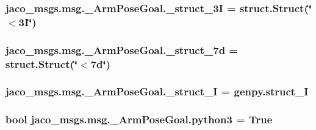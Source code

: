 \subsubsection[{\texorpdfstring{\+\_\+struct\+\_\+3I}{_struct_3I}}]{\setlength{\rightskip}{0pt plus 5cm}jaco\+\_\+msgs.\+msg.\+\_\+\+Arm\+Pose\+Goal.\+\_\+struct\+\_\+3I = struct.\+Struct(\char`\"{}$<$3\+I\char`\"{})\hspace{0.3cm}{\ttfamily [private]}}\hypertarget{namespacejaco__msgs_1_1msg_1_1__ArmPoseGoal_a1f4d3ad17579cc82a6b174aecb35eda6}{}\label{namespacejaco__msgs_1_1msg_1_1__ArmPoseGoal_a1f4d3ad17579cc82a6b174aecb35eda6}
\subsubsection[{\texorpdfstring{\+\_\+struct\+\_\+7d}{_struct_7d}}]{\setlength{\rightskip}{0pt plus 5cm}jaco\+\_\+msgs.\+msg.\+\_\+\+Arm\+Pose\+Goal.\+\_\+struct\+\_\+7d = struct.\+Struct(\char`\"{}$<$7d\char`\"{})\hspace{0.3cm}{\ttfamily [private]}}\hypertarget{namespacejaco__msgs_1_1msg_1_1__ArmPoseGoal_a61745e7c1be1c3f625392d61289a639c}{}\label{namespacejaco__msgs_1_1msg_1_1__ArmPoseGoal_a61745e7c1be1c3f625392d61289a639c}
\subsubsection[{\texorpdfstring{\+\_\+struct\+\_\+I}{_struct_I}}]{\setlength{\rightskip}{0pt plus 5cm}jaco\+\_\+msgs.\+msg.\+\_\+\+Arm\+Pose\+Goal.\+\_\+struct\+\_\+I = genpy.\+struct\+\_\+I\hspace{0.3cm}{\ttfamily [private]}}\hypertarget{namespacejaco__msgs_1_1msg_1_1__ArmPoseGoal_a226088dc549a186129ea22de76a2095b}{}\label{namespacejaco__msgs_1_1msg_1_1__ArmPoseGoal_a226088dc549a186129ea22de76a2095b}
\subsubsection[{\texorpdfstring{python3}{python3}}]{\setlength{\rightskip}{0pt plus 5cm}bool jaco\+\_\+msgs.\+msg.\+\_\+\+Arm\+Pose\+Goal.\+python3 = True}\hypertarget{namespacejaco__msgs_1_1msg_1_1__ArmPoseGoal_a3f19285c65bbb7e585cbbd9927343926}{}\label{namespacejaco__msgs_1_1msg_1_1__ArmPoseGoal_a3f19285c65bbb7e585cbbd9927343926}

